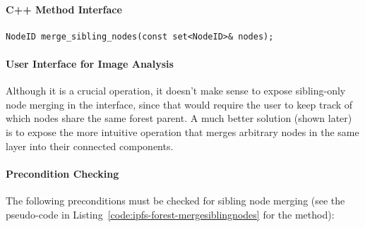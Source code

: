 \paragraph{C++ Method Interface}

\begin{lstlisting}[style=Prototype]
NodeID merge_sibling_nodes(const set<NodeID>& nodes);
\end{lstlisting}

\paragraph{User Interface for Image Analysis}

Although it is a crucial operation, it doesn't make sense to expose sibling-only node merging in the interface, since that would require the user to keep track of which nodes share the same forest parent. A much better solution (shown later) is to expose the more intuitive operation that merges arbitrary nodes in the same layer into their connected components.

\paragraph{Precondition Checking}

The following preconditions must be checked for sibling node merging (see the pseudo-code in Listing~\ref{code:ipfs-forest-mergesiblingnodes} for the method):

